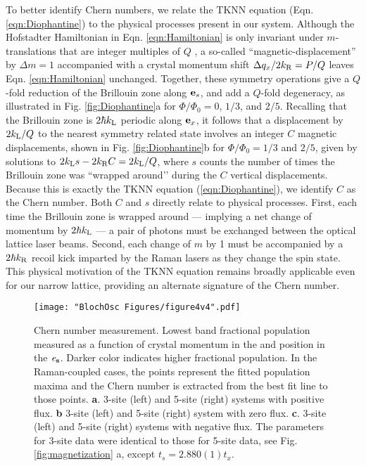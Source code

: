 	To better identify Chern numbers, we relate  the TKNN equation (Eqn. \ref{eqn:Diophantine}) to the physical processes present in our system.  Although the Hofstadter Hamiltonian in Eqn. \ref{eqn:Hamiltonian} is only invariant under $m$-translations that are integer multiples of $Q$ , a so-called ``magnetic-displacement'' by $\Delta m=1$ accompanied with a crystal momentum shift $\Delta q_x/2 k_{\rm R} = P/Q$ leaves Eqn. \ref{eqn:Hamiltonian} unchanged.  Together, these symmetry operations give a $Q$-fold reduction of the Brillouin zone along ${\bf e}_s$, and add a $Q$-fold degeneracy, as illustrated in Fig. \ref{fig:Diophantine}a  for $\Phi/\Phi_0=0$, $1/3$, and $2/5$.  Recalling that the Brillouin zone is $2 \hbar k_{\rm L}$ periodic along ${\bf e}_x$, it follows that a displacement by $2 k_{\rm L}/Q$ to the nearest symmetry related state involves an integer $C$ magnetic displacements, shown in Fig. \ref{fig:Diophantine}b for $\Phi/\Phi_0=1/3$ and $2/5$, given by solutions to $2  k_{\rm L} s - 2  k_{\rm R} C = 2  k_{\rm L}/Q$, where $s$ counts the number of times the Brillouin zone was ``wrapped around’’ during the $C$ vertical displacements. Because this is exactly the TKNN equation (\ref{eqn:Diophantine}), we identify $C$ as the Chern number.  Both $C$ and $s$ directly relate to physical processes.  First, each time the  Brillouin zone is wrapped around — implying a net change of momentum by $2 \hbar k_{\rm L}$ — a pair of photons must be exchanged between the optical lattice laser beams.  Second, each change of $m$ by 1 must be accompanied by a $2 \hbar k_{\rm R}$ recoil kick imparted by the Raman lasers as they change the spin state.  This physical motivation of the TKNN equation remains broadly applicable even for our narrow lattice, providing an alternate signature of the Chern number.
	
	
\begin{figure}
\texttt{[image: "BlochOsc Figures/figure4v4".pdf]}
\caption{Chern number measurement.  Lowest band fractional population measured as a function of crystal momentum in the  \ex  and position in the $\bf{\mathit{e}_s}$. Darker color indicates higher fractional population. In the Raman-coupled cases, the points represent the fitted population maxima and the Chern number is extracted from the best fit line to those points.  \textbf{a}. 3-site (left) and 5-site (right) systems with positive flux.  \textbf{b} 3-site (left) and 5-site (right) system with zero flux.  \textbf{c}. 3-site (left) and 5-site (right) systems with negative flux. The parameters for 3-site data were identical to those for 5-site data, see Fig. \ref{fig:magnetization} a, except $t_s =2.880(1)t_x$.}
\label{fig:finalData}
\end{figure}

